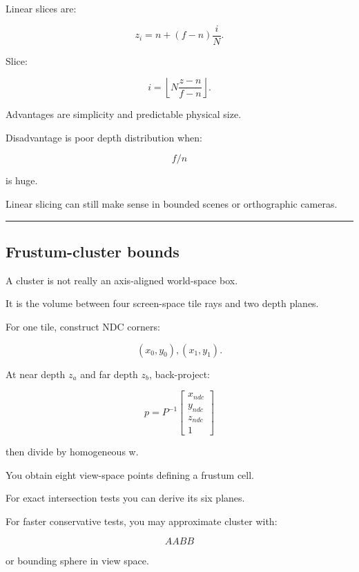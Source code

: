 \hypertarget{04-visual-computing-ii-ch040-linear-slicing}{}

Linear slices are:

\[
\boxed{
z_i=
n+
(f-n)\frac iN.
}
\]

Slice:

\[
\boxed{
i=
\left\lfloor
N
\frac{z-n}{f-n}
\right\rfloor.
}
\]

Advantages are simplicity and predictable physical size.

Disadvantage is poor depth distribution when:

\[
f/n
\]

is huge.

Linear slicing can still make sense in bounded scenes or orthographic cameras.

\begin{center}\rule{0.5\linewidth}{0.5pt}\end{center}

\subsection{Frustum-cluster bounds}\label{04-visual-computing-ii-ch040-frustum-cluster-bounds}

\hypertarget{04-visual-computing-ii-ch040-frustum-cluster-bounds}{}

A cluster is not really an axis-aligned world-space box.

It is the volume between four screen-space tile rays and two depth planes.

For one tile, construct NDC corners:

\[
(x_0,y_0),(x_1,y_1).
\]

At near depth \(z_a\) and far depth \(z_b\), back-project:

\[
p=
P^{-1}
\begin{bmatrix}
x_{ndc}\\
y_{ndc}\\
z_{ndc}\\
1
\end{bmatrix}
\]

then divide by homogeneous w.

You obtain eight view-space points defining a frustum cell.

For exact intersection tests you can derive its six planes.

For faster conservative tests, you may approximate cluster with:

\[
AABB
\]

or bounding sphere in view space.

